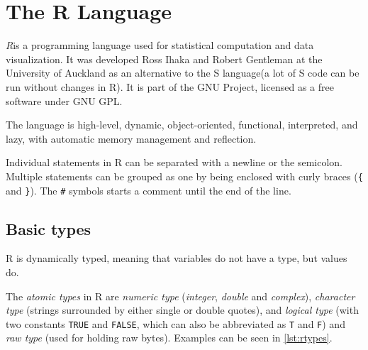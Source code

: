 \chapter{The R Language}

\begin{chapterabstract}
\end{chapterabstract}


\textit{R}\todocite is a programming language used for statistical computation and data visualization. It was developed Ross Ihaka and Robert Gentleman at the University of Auckland as an alternative to the S language\todocite (a lot of S code can be run without changes in R). It is part of the GNU Project, licensed as a free software under GNU GPL.

The language is high-level, dynamic, object-oriented, functional, interpreted, and lazy, with automatic memory management and reflection.

Individual statements in R can be separated with a newline or the semicolon. Multiple statements can be grouped as one by being enclosed with curly braces (\texttt{\{} and \texttt{\}}). The \texttt{\#} symbols starts a comment until the end of the line.

\section{Basic types}

R is dynamically typed, meaning that variables do not have a type, but values do.

The \textit{atomic types} in R are \textit{numeric type} (\textit{integer}, \textit{double} and \textit{complex}), \textit{character type} (strings surrounded by either single or double quotes), and \textit{logical type} (with two constants \texttt{TRUE} and \texttt{FALSE}, which can also be abbreviated as \texttt{T} and \texttt{F}) and \textit{raw type} (used for holding raw bytes). Examples can be seen in \ref{lst:rtypes}.

